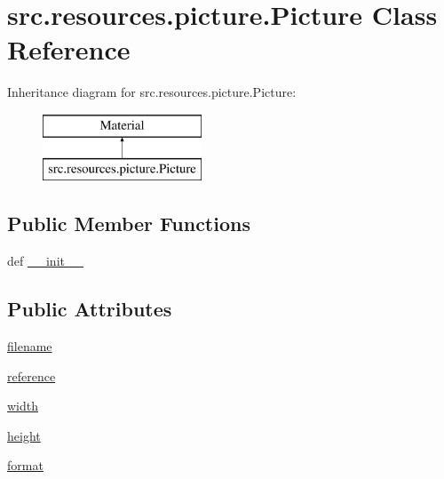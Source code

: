 \hypertarget{classsrc_1_1resources_1_1picture_1_1_picture}{\section{src.\+resources.\+picture.\+Picture Class Reference}
\label{classsrc_1_1resources_1_1picture_1_1_picture}
}
Inheritance diagram for src.\+resources.\+picture.\+Picture\+:\begin{figure}[H]
\begin{center}
\leavevmode
\includegraphics[height=2.000000cm]{classsrc_1_1resources_1_1picture_1_1_picture}
\end{center}
\end{figure}
\subsection*{Public Member Functions}
\begin{DoxyCompactItemize}
\item 
def \hyperlink{classsrc_1_1resources_1_1picture_1_1_picture_adc6ea066102180580a8183fd9c8d6d09}{\+\_\+\+\_\+init\+\_\+\+\_\+}
\end{DoxyCompactItemize}
\subsection*{Public Attributes}
\begin{DoxyCompactItemize}
\item 
\hyperlink{classsrc_1_1resources_1_1picture_1_1_picture_a003b41ddc2d0551e5f8271eea1563f88}{filename}
\item 
\hyperlink{classsrc_1_1resources_1_1picture_1_1_picture_a3eac2bc1d9a3bc1f85b441e16719a4b7}{reference}
\item 
\hyperlink{classsrc_1_1resources_1_1picture_1_1_picture_ad9329b3048acfd8dacef0dfe9ca57ded}{width}
\item 
\hyperlink{classsrc_1_1resources_1_1picture_1_1_picture_a7648bd554fb274458f7cc32fa7c48e4a}{height}
\item 
\hyperlink{classsrc_1_1resources_1_1picture_1_1_picture_afce02889d8db77869eee3103da6c46f5}{format}
\end{DoxyCompactItemize}



